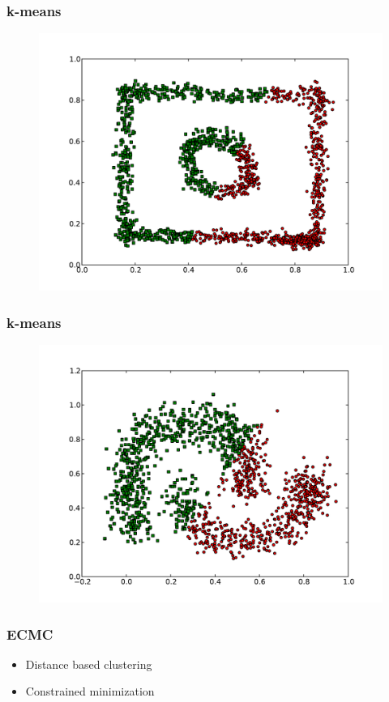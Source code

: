 \documentclass{beamer}
\begin{document}
\begin{frame}
\frametitle{k-means}
    \begin{figure}[]
    \includegraphics[scale=0.5]{kmeans_circle-weird.pdf}
    \end{figure}
\end{frame}

\begin{frame}
\frametitle{k-means}
    \begin{figure}[]
    \includegraphics[scale=0.5]{kmeans_half-moons.pdf}
    \end{figure}
\end{frame}



\begin{frame}
\frametitle{ECMC}
    \begin{itemize}
	\item Distance based clustering
    	\item Constrained minimization
    \end{itemize}
\end{frame}
\end{document}
